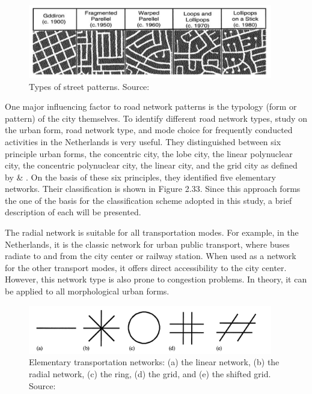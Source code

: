 \begin{figure}[h]
\centering
\includegraphics[width=0.95\textwidth,center]{picture/figure2.png}
\caption[Types of Street Patterns]{Types of street patterns. Source: \cite{Southworth:2003}}
\label{fig:streetpatterns}
\end{figure}

One major influencing factor to road network patterns is the typology (form or pattern) of the city themselves. To identify different road network types, \cite{Snellen:2002} study on the urban form, road network type, and mode choice for frequently conducted activities in the Netherlands is very useful. They distinguished between six principle urban forms, the concentric city, the lobe city, the linear polynuclear city, the concentric polynuclear city, the linear city, and the grid city as defined by \cite{deKlerk:1980} \& \cite{Rottier:1980}. On the basis of these six principles, they identified five elementary networks. Their classification is shown in Figure 2.33. Since this approach forms the one of the basis for the classification scheme adopted in this study, a brief description of each will be presented.

The radial network is suitable for all transportation modes. For example, in the Netherlands, it is the classic network for urban public transport, where buses radiate to and from the city center or railway station. When used as a network for the other transport modes, it offers direct accessibility to the city center. However, this network type is also prone to congestion problems. In theory, it can be applied to all morphological urban forms. \cite{Snellen:2002}

\begin{figure}[h]
\centering
\includegraphics[width=0.95\textwidth,center]{picture/figure3.png}
\caption[Elementary Transportation Networks]{Elementary transportation networks: (a) the linear network, (b) the radial network, (c) the ring, (d) the grid, and (e) the shifted grid. Source: \cite{Snellen:2002}}
\label{fig:transportnetworks}
\end{figure}


